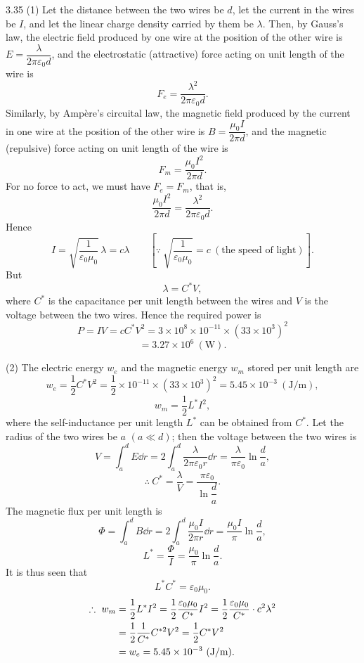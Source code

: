 \begin{solution}{3.35}
(1) Let the distance between the two wires be $d$, let the current in the wires be $I$, and let the linear charge density carried by them be $\lambda$. Then, by Gauss's law, the electric field produced by one wire at the position of the other wire is $E=\dfrac{\lambda}{2\pi\varepsilon_0d}$, and the electrostatic (attractive) force acting on unit length of the wire is
\[
F_e=\frac{\lambda^2}{2\pi\varepsilon_0d}.
\]
Similarly, by Amp\`ere's circuital law, the magnetic field produced by the current in one wire at the position of the other wire is $B=\dfrac{\mu_0I}{2\pi d}$, and the magnetic (repulsive) force acting on unit length of the wire is
\[
F_m=\frac{\mu_0I^2}{2\pi d}.
\]
For no force to act, we must have $F_e=F_m$, that is,
\[
\frac{\mu_0I^2}{2\pi d}=\frac{\lambda^2}{2\pi\varepsilon_0d}.
\]
Hence
\[
I=\sqrt{\frac{1}{\varepsilon_0\mu_0}}\,\lambda=c\lambda
\qquad\left[\because\ \sqrt{\frac{1}{\varepsilon_0\mu_0}}=c\ (\text{the speed of light})\right].
\]
But
\[
\lambda=C^{*}V,
\]
where $C^{*}$ is the capacitance per unit length between the wires and $V$ is the voltage between the two wires. Hence the required power is
\[
P=IV=cC^{*}V^2=3\times10^8\times10^{-11}\times\left(33\times10^3\right)^2
\]
\[
=3.27\times10^6\ (\text{W}).
\]

(2) The electric energy $w_e$ and the magnetic energy $w_m$ stored per unit length are
\[
w_e=\frac{1}{2}C^{*}V^2=\frac{1}{2}\times10^{-11}\times\left(33\times10^3\right)^2=5.45\times10^{-3}\ (\text{J/m}),
\]
\[
w_m=\frac{1}{2}L^{*}I^2,
\]
where the self-inductance per unit length $L^{*}$ can be obtained from $C^{*}$. Let the radius of the two wires be $a$ $(a\ll d)$; then the voltage between the two wires is
\[
V=\int_a^d E\dd r=2\int_a^d\frac{\lambda}{2\pi\varepsilon_0r}\dd r=\frac{\lambda}{\pi\varepsilon_0}\ln\frac{d}{a},
\]
\[
\therefore\ C^{*}=\frac{\lambda}{V}=\frac{\pi\varepsilon_0}{\ln\dfrac{d}{a}}.
\]
The magnetic flux per unit length is
\[
\Phi=\int_a^d B\dd r=2\int_a^d\frac{\mu_0I}{2\pi r}\dd r=\frac{\mu_0I}{\pi}\ln\frac{d}{a},
\]
\[
L^{*}=\frac{\Phi}{I}=\frac{\mu_0}{\pi}\ln\frac{d}{a}.
\]
It is thus seen that
\[
L^{*}C^{*}=\varepsilon_0\mu_0 .
\]
\begin{align}
\therefore\ w_m&=\frac{1}{2}L^{*}I^2=\frac{1}{2}\frac{\varepsilon_0\mu_0}{C^{*}}I^2
=\frac{1}{2}\frac{\varepsilon_0\mu_0}{C^{*}}\cdot c^2\lambda^2\notag\\
&=\frac{1}{2}\frac{1}{C^{*}}C^{*2}V^2=\frac{1}{2}C^{*}V^2\notag\\
&=w_e=5.45\times10^{-3}\ (\text{J/m}).\notag
\end{align}
\end{solution}

